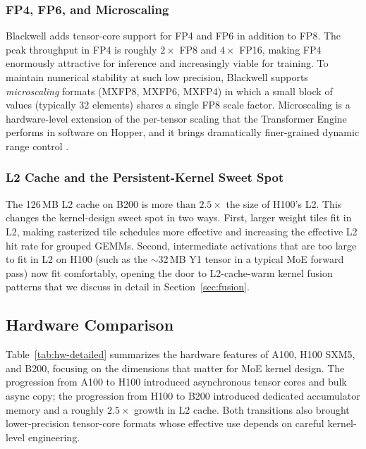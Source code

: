 \documentclass[10pt]{article}
\begin{document}
\subsubsection{FP4, FP6, and Microscaling}
Blackwell adds tensor-core support for FP4 and FP6 in addition to FP8. The peak throughput in FP4 is roughly $2\times$ FP8 and $4\times$ FP16, making FP4 enormously attractive for inference and increasingly viable for training. To maintain numerical stability at such low precision, Blackwell supports \emph{microscaling} formats (MXFP8, MXFP6, MXFP4) in which a small block of values (typically 32 elements) shares a single FP8 scale factor. Microscaling is a hardware-level extension of the per-tensor scaling that the Transformer Engine performs in software on Hopper, and it brings dramatically finer-grained dynamic range control \citep{rouhani2023microscaling}.

\subsubsection{L2 Cache and the Persistent-Kernel Sweet Spot}
The 126\,MB L2 cache on B200 is more than $2.5\times$ the size of H100's L2. This changes the kernel-design sweet spot in two ways. First, larger weight tiles fit in L2, making rasterized tile schedules more effective and increasing the effective L2 hit rate for grouped GEMMs. Second, intermediate activations that are too large to fit in L2 on H100 (such as the $\sim$32\,MB Y1 tensor in a typical MoE forward pass) now fit comfortably, opening the door to L2-cache-warm kernel fusion patterns that we discuss in detail in Section~\ref{sec:fusion}.

\subsection{Hardware Comparison}
\label{sec:hw-comparison}

Table~\ref{tab:hw-detailed} summarizes the hardware features of A100, H100 SXM5, and B200, focusing on the dimensions that matter for MoE kernel design. The progression from A100 to H100 introduced asynchronous tensor cores and bulk async copy; the progression from H100 to B200 introduced dedicated accumulator memory and a roughly $2.5\times$ growth in L2 cache. Both transitions also brought lower-precision tensor-core formats whose effective use depends on careful kernel-level engineering.
\end{document}
